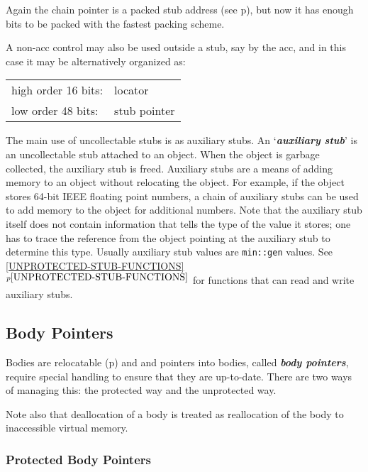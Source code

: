 \documentclass[12pt]{article}
\newcommand{\key}[1]{{\bf \em #1}\index{#1}}
\newcommand{\skey}[2]{{\bf \em #1#2}\index{#1}}
\newcommand{\itemref}[1]{\ref{#1}$^{p\pageref{#1}}$}
\newcommand{\pagref}[1]{p\pageref{#1}}
\begin{document}
Again the chain pointer is a packed stub address
(see \pagref{STUB-ADDRESS-PACKING}),
but now it has enough bits to be packed with the fastest packing scheme.

A non-acc control may also be used outside a stub, say by the acc, and
in this case it may be alternatively organized as:

\begin{center}
\begin{tabular}{ll}
high order 16 bits:	& locator \\
low order 48 bits:	& stub pointer \\
\end{tabular}
\end{center}

The main use of uncollectable stubs is as auxiliary stubs.
An `\key{auxiliary stub}' is an uncollectable stub attached to an object.
When the object is garbage collected, the auxiliary stub is freed.  Auxiliary
stubs are a means of adding memory to an object without relocating the object.
For example, if the object stores 64-bit IEEE floating point numbers,
a chain of auxiliary stubs can be used to add memory to the object
for additional numbers.  Note that the auxiliary stub itself does not
contain information that tells the type of the value it stores;
one has to trace the reference from the object pointing at the
auxiliary stub to determine this type.  Usually auxiliary stub
values are \verb|min::gen| values.  See \itemref{UNPROTECTED-STUB-FUNCTIONS}
for functions that can read and write auxiliary stubs.

\subsection{Body Pointers}
\label{BODY-POINTERS}

Bodies are relocatable
(\pagref{RELOCATABLE-BODY}) and and pointers into bodies,
called \skey{body pointer}s,
require special handling to
ensure that they are up-to-date.  There are two ways of managing
this: the protected way and the unprotected way.

Note also that deallocation of a body is treated as
reallocation of the body to inaccessible virtual memory.

\subsubsection{Protected Body Pointers}
\label{PROTECTED-BODY-POINTERS}
\end{document}
